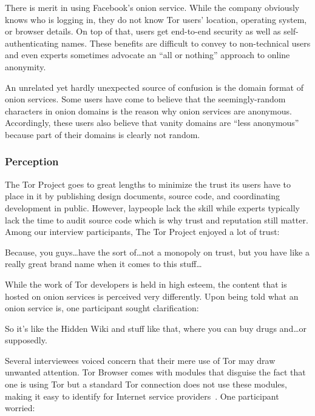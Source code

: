 There is merit in using Facebook's onion service.  While the company obviously
knows who is logging in, they do not know Tor users' location, operating system,
or browser details.  On top of that, users get end-to-end security as well as
self-authenticating names.  These benefits are difficult to convey to
non-technical users and even experts sometimes advocate an ``all or nothing''
approach to online anonymity.

An unrelated yet hardly unexpected source of confusion is the domain format of
onion services.  Some users have come to believe that the seemingly-random
characters in onion domains is the reason why onion services are anonymous.
Accordingly, these users also believe that vanity domains are ``less anonymous''
because part of their domains is clearly not random.

\subsubsection{Perception}

The Tor Project goes to great lengths to minimize the trust its users have to
place in it by publishing design documents, source code, and coordinating
development in public.  However, laypeople lack the skill while experts
typically lack the time to audit source code which is why trust and reputation
still matter.  Among our interview participants, The Tor Project enjoyed a lot
of trust:

\begin{displayquote}
Because, you guys\dots have the sort of\dots not a monopoly on trust, but you
have like a really great brand name when it comes to this stuff\dots
\end{displayquote}

While the work of Tor developers is held in high esteem, the content that is
hosted on onion services is perceived very differently.  Upon being told what an
onion service is, one participant sought clarification:

\begin{displayquote}
So it's like the Hidden Wiki and stuff like that, where you can buy drugs
and\dots or supposedly.
\end{displayquote}

Several interviewees voiced concern that their mere use of Tor may draw unwanted
attention.  Tor Browser comes with modules that disguise the fact that one is
using Tor but a standard Tor connection does not use these modules, making it
easy to identify for Internet service providers~\cite{pluggable}.  One
participant worried:


